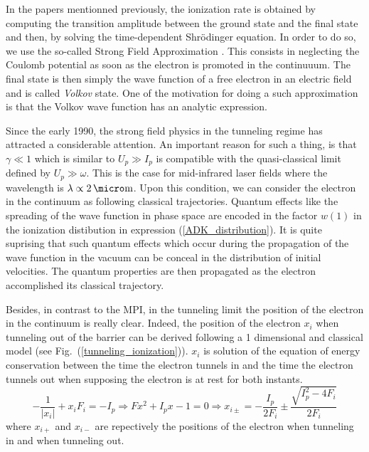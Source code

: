 \documentclass[a4paper]{article}
\begin{document}
In the papers mentionned previously, the ionization rate is obtained by computing the transition amplitude between the ground state and the final state and then, by solving the time-dependent Shr\"odinger equation. In order to do so, we use the so-called Strong Field Approximation \cite{Misha_2014}. This consists in neglecting the Coulomb potential as soon as the electron is promoted in the continuuum. The final state is then simply the wave function of a free electron in an electric field and is called \textit{Volkov} state. One of the motivation for doing a such approximation is that the Volkov wave function has an analytic expression.
\par
Since the early 1990, the strong field physics in the tunneling regime has attracted a considerable attention. An important reason for such a thing, is that $\gamma \ll 1$ which is similar to $U_{p} \gg I_{p}$ is compatible with the quasi-classical limit defined by $U_{p} \gg \omega$. This is the case for mid-infrared laser fields where the wavelength is $\lambda \propto 2\,\micro\text{m}$. Upon this condition, we can consider the electron in the continuum as following classical trajectories. Quantum effects like the spreading of the wave function in phase space are encoded in the factor $w(1)$ in the ionization distibution in expression (\ref{ADK_distribution}). It is quite suprising that such quantum effects which occur during the propagation of the wave function in the vacuum can be conceal in the distribution of initial velocities. The quantum properties are then propagated as the electron accomplished its classical trajectory. 
\par
Besides, in contrast to the MPI, in the tunneling limit the position of the electron in the continuum is really clear.
Indeed, the position of the electron $x_{i}$ when tunneling out of the barrier can be derived following a 1 dimensional and classical model (see Fig.~(\ref{tunneling_ionization})). $x_{i}$ is solution of the equation of energy conservation between the time the electron tunnels in and the time the electron tunnels out when supposing the electron is at rest for both instants.
\begin{equation}
-\frac{1}{| x_{i} |}+x_{i}F_{i}=-I_{p} \Rightarrow Fx^{2}+I_{p}x-1=0 \Rightarrow x_{i\pm}=-\frac{I_{p}}{2F_{i}}\pm\frac{\sqrt{I_{p}^{2}-4F_{i}}}{2F_{i}}
\end{equation} 
where $x_{i+}$ and $x_{i-}$ are repectively the positions of the electron when tunneling in and when tunneling out.
\end{document}
